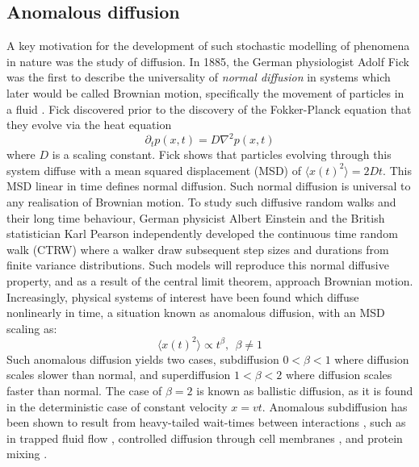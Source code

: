 \subsection{Anomalous diffusion}\label{subsec:anom_diff}
A key motivation for the development of such stochastic modelling of phenomena in nature was the study of diffusion. In 1885, the German physiologist Adolf Fick was the first to describe the universality of \textit{normal diffusion} in systems which later would be called Brownian motion, specifically the movement of particles in a fluid \cite{klafter_anomalous_2005}. Fick discovered prior to the discovery of the Fokker-Planck equation that they evolve via the heat equation
\begin{equation}
    \partial_t p(x,t) = D \nabla^2 p(x,t)
\end{equation}
where $D$ is a scaling constant. Fick shows that particles evolving through this system diffuse with a mean squared displacement (MSD) of $\langle x(t)^2 \rangle = 2Dt$. This MSD linear in time defines normal diffusion. Such normal diffusion is universal to any realisation of Brownian motion. To study such diffusive random walks and their long time behaviour, German physicist Albert Einstein and the British statistician Karl Pearson independently developed the continuous time random walk (CTRW) where a walker draw subsequent step sizes and durations from finite variance distributions. Such models will reproduce this normal diffusive property, and as a result of the central limit theorem, approach Brownian motion. Increasingly, physical systems of interest have been found which diffuse nonlinearly in time, a situation known as anomalous diffusion, with an MSD scaling as:
\begin{equation}
    \langle x(t) ^2 \rangle \propto t^{\beta}, \ \ \beta \neq 1
\end{equation}
Such anomalous diffusion yields two cases, subdiffusion $0 < \beta < 1$ where diffusion scales slower than normal, and superdiffusion $1 < \beta < 2$ where diffusion scales faster than normal. The case of $\beta = 2$ is known as ballistic diffusion, as it is found in the deterministic case of constant velocity $x = vt$. Anomalous subdiffusion has been shown to result from heavy-tailed wait-times between interactions \cite{klafter_anomalous_2005}, such as in trapped fluid flow \cite{Kirchner2000-kf}, controlled diffusion through cell membranes \cite{klafter_anomalous_2005}, and protein mixing \cite{Kou2004-kz}.
